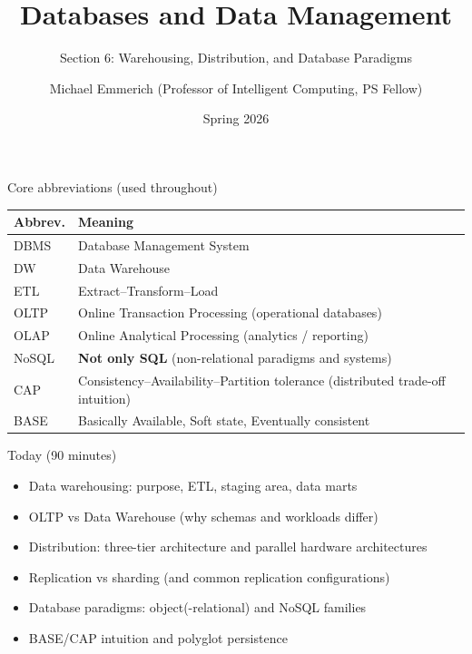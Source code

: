 \documentclass[10pt,aspectratio=169]{beamer}
\title{Databases and Data Management}
\subtitle{Section 6: Warehousing, Distribution, and Database Paradigms}
\author{Michael Emmerich (Professor of Intelligent Computing, PS Fellow)}
\institute{Faculty of Information Technology\\University of Jyväskylä}
\date{Spring 2026}
\begin{document}
\maketitle


\begin{frame}{Core abbreviations (used throughout)}
\small
\begin{tabular}{@{}p{2.2cm}p{11.8cm}@{}}
\toprule
\textbf{Abbrev.} & \textbf{Meaning} \\
\midrule
DBMS & Database Management System \\
DW & Data Warehouse \\
ETL & Extract--Transform--Load \\
OLTP & Online Transaction Processing (operational databases) \\
OLAP & Online Analytical Processing (analytics / reporting) \\
NoSQL & \textbf{Not only SQL} (non-relational paradigms and systems) \\
CAP & Consistency--Availability--Partition tolerance (distributed trade-off intuition) \\
BASE & Basically Available, Soft state, Eventually consistent \\
\bottomrule
\end{tabular}
\end{frame}
\begin{frame}{Today (90 minutes)}
\begin{itemize}
  \item Data warehousing: purpose, ETL, staging area, data marts
  \item OLTP vs Data Warehouse (why schemas and workloads differ)
  \item Distribution: three-tier architecture and parallel hardware architectures
  \item Replication vs sharding (and common replication configurations)
  \item Database paradigms: object(-relational) and NoSQL families
  \item BASE/CAP intuition and polyglot persistence
\end{itemize}
\end{frame}
\end{document}
